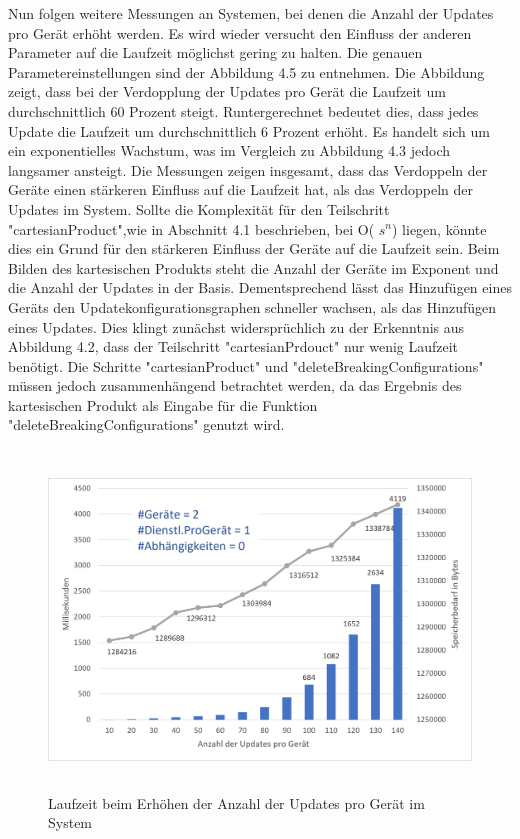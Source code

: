 \newpage
Nun folgen weitere Messungen an Systemen, bei denen die Anzahl der Updates pro Gerät erhöht werden. Es wird wieder versucht den Einfluss der anderen Parameter auf
die Laufzeit möglichst gering zu halten. Die genauen Parametereinstellungen sind der Abbildung 4.5 zu entnehmen.
Die Abbildung zeigt, dass bei der Verdopplung der Updates pro Gerät die Laufzeit um durchschnittlich 60 Prozent steigt. Runtergerechnet bedeutet dies, dass jedes Update
die Laufzeit um durchschnittlich 6 Prozent erhöht. Es handelt sich um ein exponentielles Wachstum, was im Vergleich zu Abbildung 4.3 jedoch langsamer ansteigt. Die Messungen
zeigen insgesamt, dass das Verdoppeln der Geräte einen stärkeren Einfluss auf die Laufzeit hat, als das Verdoppeln der Updates im System.
Sollte die Komplexität für den Teilschritt "cartesianProduct",wie in Abschnitt 4.1 beschrieben, bei O( \( s^n\)) liegen, könnte dies ein Grund für den stärkeren
Einfluss der Geräte auf die Laufzeit sein.
Beim Bilden des kartesischen Produkts steht die Anzahl der Geräte im Exponent und die Anzahl der Updates in der Basis. Dementsprechend lässt das Hinzufügen eines
Geräts den Updatekonfigurationsgraphen schneller wachsen, als das Hinzufügen eines Updates. Dies klingt zunächst widersprüchlich zu der Erkenntnis aus Abbildung 4.2, dass
der Teilschritt "cartesianPrdouct" nur wenig Laufzeit benötigt. Die Schritte "cartesianProduct" und "deleteBreakingConfigurations" müssen jedoch zusammenhängend betrachtet
werden, da das Ergebnis des kartesischen Produkt als Eingabe für die Funktion "deleteBreakingConfigurations" genutzt wird.
\FloatBarrier
\begin{figure}[h]
\begin{center}
\includegraphics[width=14cm,height=9cm]{"images/Steigende Updatezahl"}
\caption{Laufzeit beim Erhöhen der Anzahl der Updates pro Gerät im System}
\label{fig:Prob1:MEA}
\end{center}
\end{figure}
